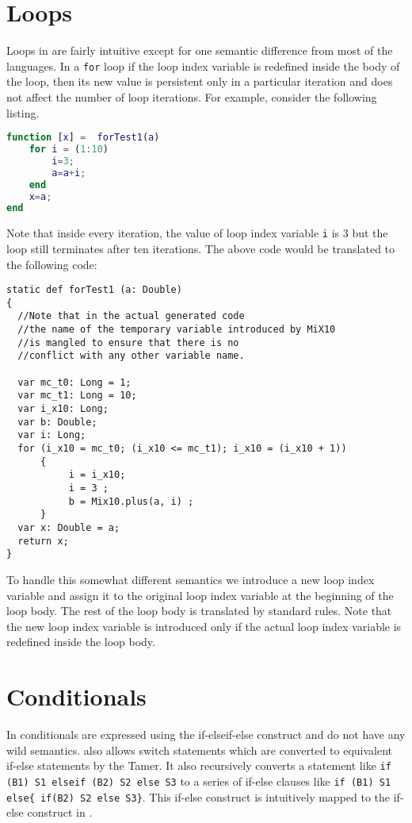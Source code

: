 \section{Loops}

Loops in \matlab are fairly intuitive except for one semantic difference
from most of the languages. In a \verb|for| loop if the loop index
variable is redefined inside the body of the loop, then its new value is
persistent only in a particular iteration and does not affect the number
of loop iterations. For example, consider the following listing.

\begin{lstlisting}[language=Matlab,numbers=none]
function [x] =  forTest1(a)
    for i = (1:10)
        i=3;
        a=a+i;
    end
    x=a;
end
\end{lstlisting}

\noindent 
Note that inside every iteration, the value of loop index
variable \verb|i| is 3 but the loop still terminates after ten
iterations. The above code would be translated to the following \xten
code:

\begin{lstlisting}[language=X10,numbers=none]
static def forTest1 (a: Double)
{
  //Note that in the actual generated code
  //the name of the temporary variable introduced by MiX10
  //is mangled to ensure that there is no 
  //conflict with any other variable name. 
  
  var mc_t0: Long = 1;
  var mc_t1: Long = 10;
  var i_x10: Long;
  var b: Double;
  var i: Long;
  for (i_x10 = mc_t0; (i_x10 <= mc_t1); i_x10 = (i_x10 + 1))
      {   
           i = i_x10;
           i = 3 ;
           b = Mix10.plus(a, i) ;
      }
  var x: Double = a;
  return x;
}
\end{lstlisting}

To handle this somewhat different semantics we introduce a new loop
index variable and assign it to the original loop index variable at the
beginning of the loop body. The rest of the loop body is translated by
standard rules.  Note that the new loop index variable is
introduced only if the actual loop index variable is redefined inside
the loop body. 

\section{Conditionals}

In \matlab conditionals are expressed using the if-elseif-else construct
and do not have any wild semantics. \matlab also allows switch
statements which are converted to equivalent if-else statements by the
Tamer. It also recursively converts a statement like 
\texttt{if (B1) S1 elseif (B2) S2 else S3} to a series of if-else clauses like 
\texttt{if (B1) S1 else\{ if(B2) S2 else S3\}}. This if-else construct is 
intuitively mapped to the if-else construct in \xten. 

